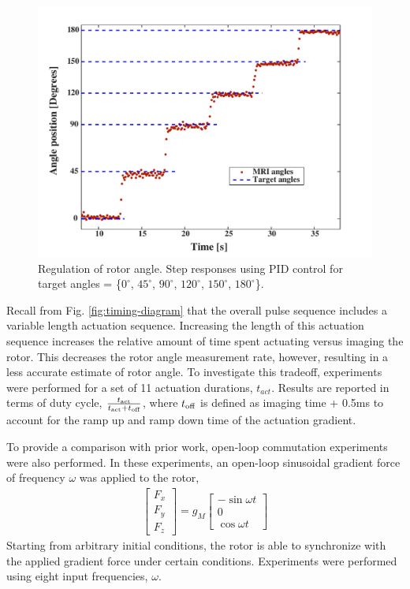 \documentclass[journal]{IEEEtran}
\begin{document}
\begin{figure}
\begin{center}
	\includegraphics[width=1.0\columnwidth]{Figure16.pdf}
\end{center}
\caption{Regulation of rotor angle. Step responses using PID control for target angles = \{$0^\circ$, $45^\circ$, $90^\circ$, $120^\circ$, $150^\circ$, $180^\circ$\}.}
\label{fig:pid1-results}
\vspace{-10pt}
\end{figure}


Recall from Fig. \ref{fig:timing-diagram} that the overall pulse sequence includes a variable length actuation sequence. Increasing the length of this actuation sequence increases the relative amount of time spent actuating versus imaging the rotor. This decreases the rotor angle measurement rate, however, resulting in a less accurate estimate of rotor angle. To investigate this tradeoff, experiments were performed for a set of 11 actuation durations, $t_{act}$.  Results are reported in terms of duty cycle, $\frac{t_\textnormal{act}}{t_\textnormal{act}+t_\textnormal{off}}$, where $t_\textnormal{{off}}$ is defined as imaging time + 0.5ms to account for the ramp up and ramp down time of the actuation gradient.

To provide a comparison with prior work, open-loop commutation experiments were also performed. In these experiments, an open-loop sinusoidal gradient force of frequency $\omega$ was applied to the rotor, 
\begin{align}
\begin{bmatrix}F_x\\F_y\\F_z\end{bmatrix} =  g_M
\begin{bmatrix}
-\sin \omega t \\ 
0 \\ 
\cos \omega t \end{bmatrix}
\label{eq:openLoopControlLaw}
\end{align}
Starting from arbitrary initial conditions, the rotor is able to synchronize with the applied gradient force under certain conditions. Experiments were performed using eight input frequencies, $\omega$.
\end{document}
